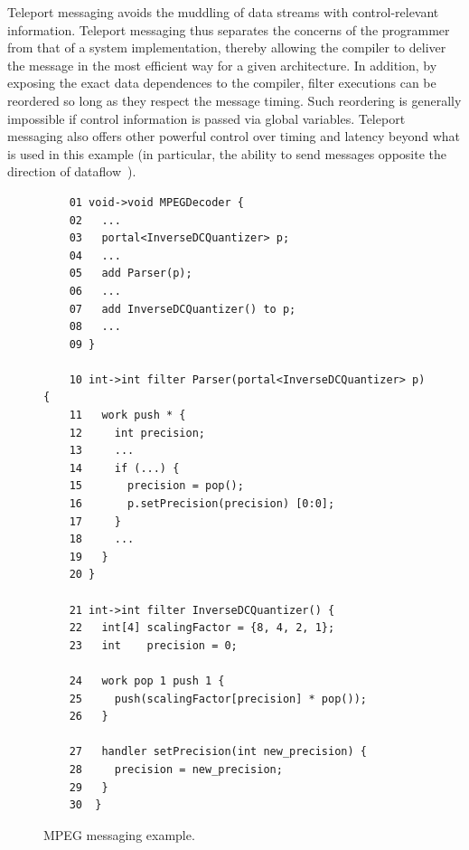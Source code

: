 Teleport messaging avoids the muddling of data streams with
control-relevant information. Teleport messaging thus separates the
concerns of the programmer from that of a system implementation,
thereby allowing the compiler to deliver the message in the most
efficient way for a given architecture. In addition, by exposing the
exact data dependences to the compiler, filter executions can be
reordered so long as they respect the message timing.  Such reordering
is generally impossible if control information is passed via global
variables.  Teleport messaging also offers other powerful control over
timing and latency beyond what is used in this example (in particular,
the ability to send messages opposite the direction of
dataflow~\cite{thies05ppopp}).

\begin{figure}[t]
  \begin{scriptsize}
    \begin{verbatim}
	01 void->void MPEGDecoder {
	02   ...
	03   portal<InverseDCQuantizer> p;
	04   ...
	05   add Parser(p);
	06   ...
	07   add InverseDCQuantizer() to p;
	08   ...
	09 }

	10 int->int filter Parser(portal<InverseDCQuantizer> p) {
	11   work push * {
	12     int precision;
	13     ...
	14     if (...) {
	15       precision = pop();
	16       p.setPrecision(precision) [0:0];
	17     }
	18     ...
	19   }
	20 }

	21 int->int filter InverseDCQuantizer() {
	22   int[4] scalingFactor = {8, 4, 2, 1};
	23   int    precision = 0;

	24   work pop 1 push 1 {
	25     push(scalingFactor[precision] * pop());
	26   }

	27   handler setPrecision(int new_precision) {
	28     precision = new_precision;
	29   }
	30  }
    \end{verbatim}
  \end{scriptsize}
  \caption{MPEG messaging example.}
  \label{fig:messaging}
\end{figure}
